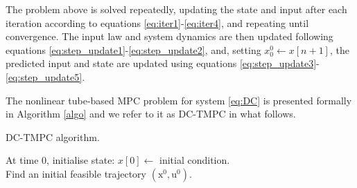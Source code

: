 \documentclass[letterpaper, 10 pt, conference]{ieeeconf}
\begin{document}
The problem above is solved repeatedly,  updating the state and input after each iteration according to equations \eqref{eq:iter1}-\eqref{eq:iter4}, and repeating until convergence. The input law and system dynamics are then updated following equations \eqref{eq:step_update1}-\eqref{eq:step_update2}, and, setting $x^0_0 \longleftarrow  x[n+1]$,  the predicted input and state are updated using equations \eqref{eq:step_update3}-\eqref{eq:step_update5}.

The nonlinear tube-based MPC problem for system \eqref{eq:DC} is presented formally in Algorithm \ref{algo} and we refer to it as DC-TMPC in what follows. %

\begin{algorithm}
\caption{DC-TMPC algorithm.}
\label{algo}
    At time 0, initialise state: $x[0] \gets$ initial condition. \\
    Find an initial feasible trajectory $(\bm{\mathrm{x}}^0, \bm{\mathrm{u}}^0)$. \\
\end{algorithm}
\end{document}
